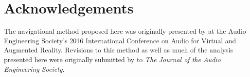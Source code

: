 \section*{Acknowledgements}
The navigational method proposed here was originally presented by \citet{TylkaChoueiri2016} at the Audio Engineering Society's 2016 International Conference on Audio for Virtual and Augmented Reality. %
Revisions to this method as well as much of the analysis presented here were originally submitted by \citet{TylkaChoueiri2019b} to \textit{The Journal of the Audio Engineering Society}.
